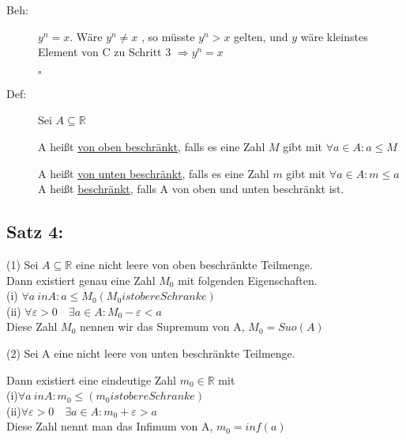 \documentclass[12pt,a4paper]{article}
\begin{document}
\begin{description}
\item[Beh:] $y^{n}=x$. Wäre $y^{n}\neq x$ , so müsste $y^n>x$ gelten, und $y$ wäre kleinstes Element von C \blitze zu Schritt 3 $\Rightarrow y^n=x$
\begin{flushright}$ \square $ \end{flushright} 
\end{description}
\begin{description}
\item[Def:] Sei $ A\subseteq \mathbb{R}$

A heißt \underline{von oben beschränkt}, falls es eine Zahl $M$ gibt mit $\forall a \in A:a\leq M$ 

A heißt \underline{von unten beschränkt}, falls es eine Zahl $m$ gibt mit $\forall a \in A:m\leq a$
A heißt \underline{beschränkt}, falls A von oben und unten beschränkt ist.
\end{description}

\subsection*{Satz 4:} (1)
Sei $A\subseteq \mathbb{R}$ eine nicht leere von oben beschränkte Teilmenge.\\ Dann existiert genau eine Zahl $M_{0}$ mit folgenden Eigenschaften.\\
 
(i) $\forall a \ in A : a\leq M_{0}(M_{0}ist obere Schranke)$\\

(ii) $\forall \varepsilon>0\quad \exists a\in A: M_{0}-\varepsilon<a$\\

Diese Zahl $M_{0}$ nennen wir das Supremum von A, $M_{0}= Suo(A)$\\

\begin{flushleft}
(2) Sei A eine nicht leere von unten beschränkte Teilmenge.
\end{flushleft} 

 Dann existiert eine eindeutige Zahl $m_{0}\in \mathbb{R}$ mit\\

(i)$\forall a \ in A : m_{0}\leq(m_{0}ist obere Schranke)$ \\

(ii)$\forall \varepsilon>0\quad \exists a\in A: m_{0}+\varepsilon>a$\\

Diese Zahl nennt man das Infimum von A, $m_{0}= inf(a)$
\end{document}
